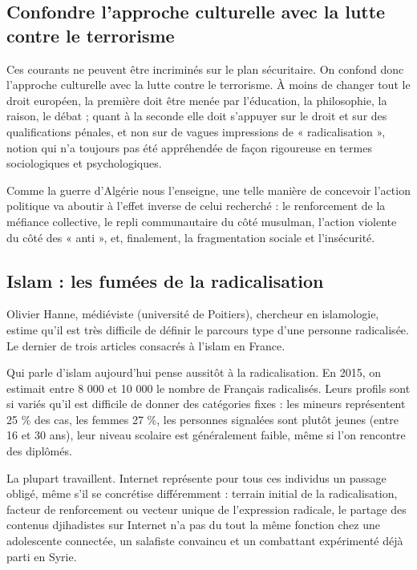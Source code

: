 \subsection{Confondre l'approche culturelle avec la lutte contre le
terrorisme}

Ces courants ne peuvent être incriminés sur le plan sécuritaire. On
confond donc l'approche culturelle avec la lutte contre le terrorisme. À
moins de changer tout le droit européen, la première doit être menée par
l'éducation, la philosophie, la raison, le débat ; quant à la seconde
elle doit s'appuyer sur le droit et sur des qualifications pénales, et
non sur de vagues impressions de « radicalisation », notion qui n'a
toujours pas été appréhendée de façon rigoureuse en termes sociologiques
et psychologiques.

Comme la guerre d'Algérie nous l'enseigne, une telle manière de
concevoir l'action politique va aboutir à l'effet inverse de celui
recherché : le renforcement de la méfiance collective, le repli
communautaire du côté musulman, l'action violente du côté des « anti »,
et, finalement, la fragmentation sociale et l'insécurité.

\subsection{Islam : les fumées de la radicalisation}

Olivier Hanne, médiéviste (université de Poitiers), chercheur en
islamologie, estime qu'il est très difficile de définir le parcours type
d'une personne radicalisée. Le dernier de trois articles consacrés à
l'islam en France. 
 

Qui parle d'islam aujourd'hui pense aussitôt à la radicalisation. En
2015, on estimait entre 8 000 et 10 000 le nombre de Français
radicalisés. Leurs profils sont si variés qu'il est difficile de donner
des catégories fixes : les mineurs représentent 25 \% des cas, les
femmes 27 \%, les personnes signalées sont plutôt jeunes (entre 16 et 30
ans), leur niveau scolaire est généralement faible, même si l'on
rencontre des diplômés.

La plupart travaillent. Internet représente pour tous ces individus un
passage obligé, même s'il se concrétise différemment : terrain initial
de la radicalisation, facteur de renforcement ou vecteur unique de
l'expression radicale, le partage des contenus djihadistes sur Internet
n'a pas du tout la même fonction chez une adolescente connectée, un
salafiste convaincu et un combattant expérimenté déjà parti en Syrie.

